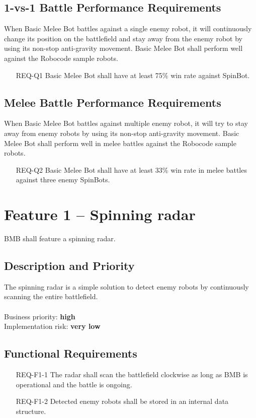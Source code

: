 \documentclass{scrreprt}
\begin{document}
\subsection{1-vs-1 Battle Performance Requirements}
When Basic Melee Bot battles against a single enemy robot, it will continuously change its position on the battlefield and stay away from the enemy robot by using its non-stop anti-gravity movement. Basic Melee Bot shall perform well against the Robocode sample robots.

\begin{itemize}
\item[REQ-Q1] Basic Melee Bot shall have at least 75\% win rate against SpinBot.
\end{itemize}

\subsection{Melee Battle Performance Requirements}
When Basic Melee Bot battles against multiple enemy robot, it will try to stay away from enemy robots by using its non-stop anti-gravity movement. Basic Melee Bot shall perform well in melee battles against the Robocode sample robots.

\begin{itemize}
\item[REQ-Q2] Basic Melee Bot shall have at least 33\% win rate in melee battles against three enemy SpinBots.
\end{itemize}

\section{Feature 1 -- Spinning radar}
BMB shall feature a spinning radar.

\subsection{Description and Priority}
The spinning radar is a simple solution to detect enemy robots by continuously scanning the entire battlefield.\\\\Business priority: \textbf{high}\\
Implementation risk: \textbf{very low}

\subsection{Functional Requirements}
\begin{itemize}
\item[REQ-F1-1] The radar shall scan the battlefield clockwise as long as BMB is operational and the battle is ongoing.
\item[REQ-F1-2] Detected enemy robots shall be stored in an internal data structure. 
\end{itemize}
\end{document}
